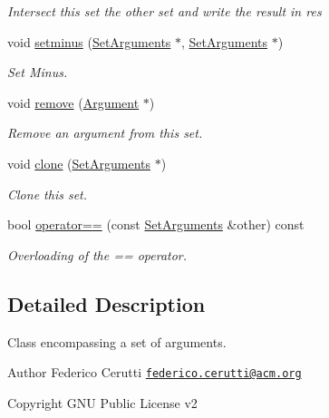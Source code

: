 \begin{DoxyCompactItemize}
\begin{DoxyCompactList}\small\item\em Intersect this set the {\ttfamily other} set and write the result in {\ttfamily res} \end{DoxyCompactList}\item 
void \hyperlink{classSetArguments_a80e626de391cabfc0a20da509c328055}{setminus} (\hyperlink{classSetArguments}{Set\-Arguments} $\ast$, \hyperlink{classSetArguments}{Set\-Arguments} $\ast$)
\begin{DoxyCompactList}\small\item\em Set Minus. \end{DoxyCompactList}\item 
void \hyperlink{classSetArguments_a11b8009ff9cd0961731eac8ee95c4b55}{remove} (\hyperlink{classArgument}{Argument} $\ast$)
\begin{DoxyCompactList}\small\item\em Remove an argument from this set. \end{DoxyCompactList}\item 
void \hyperlink{classSetArguments_a3a3052b05dff877886f84ab99280d6f7}{clone} (\hyperlink{classSetArguments}{Set\-Arguments} $\ast$)
\begin{DoxyCompactList}\small\item\em Clone this set. \end{DoxyCompactList}\item 
bool \hyperlink{classSetArguments_a22ed014efa057dd385c5ea89b6de5e94}{operator==} (const \hyperlink{classSetArguments}{Set\-Arguments} \&other) const 
\begin{DoxyCompactList}\small\item\em Overloading of the == operator. \end{DoxyCompactList}\end{DoxyCompactItemize}


\subsection{Detailed Description}
Class encompassing a set of arguments. 

\begin{DoxyAuthor}{Author}
Federico Cerutti \href{mailto:federico.cerutti@acm.org}{\tt federico.\-cerutti@acm.\-org} 
\end{DoxyAuthor}
\begin{DoxyCopyright}{Copyright}
G\-N\-U Public License v2 
\end{DoxyCopyright}


